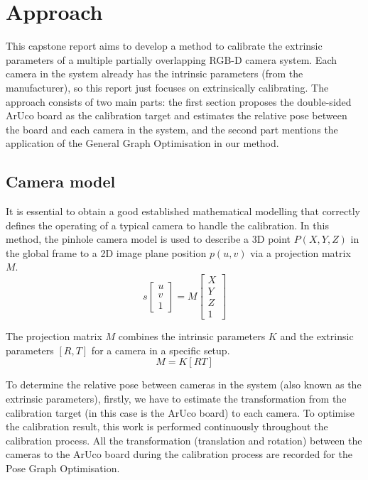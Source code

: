 \chapter{Approach}

This capstone report aims to develop a method to calibrate the extrinsic parameters of a multiple partially overlapping RGB-D camera system. Each camera in the system already has the intrinsic parameters (from the manufacturer), so this report just focuses on extrinsically calibrating. The approach consists of two main parts: the first section proposes the double-sided ArUco board as the calibration target and estimates the relative pose between the board and each camera in the system, and the second part mentions the application of the General Graph Optimisation in our method.

\clearpage
\section{Camera model}

It is essential to obtain a good established mathematical modelling that correctly defines the operating of a typical camera to handle the calibration. In this method, the pinhole camera model is used to describe a 3D point $P(X, Y, Z)$ in the global frame to a 2D image plane position $p(u, v)$ via a projection matrix $M$.
\[
s
\begin{bmatrix}
    u \\
    v \\
    1
\end{bmatrix}
=M
\begin{bmatrix}
    X \\
    Y \\
    Z \\
    1
\end{bmatrix}
\]

The projection matrix $M$ combines the intrinsic parameters $K$ and the extrinsic parameters $[R, T]$ for a camera in a specific setup.
\[
M=K[R T]
\]

To determine the relative pose between cameras in the system (also known as the extrinsic parameters), firstly, we have to estimate the transformation from the calibration target (in this case is the ArUco board) to each camera. To optimise the calibration result, this work is performed continuously throughout the calibration process. All the transformation (translation and rotation) between the cameras to the ArUco board during the calibration process are recorded for the Pose Graph Optimisation.

